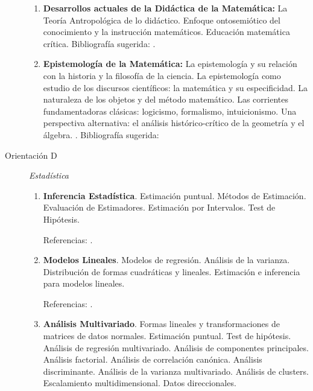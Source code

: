 \documentclass[a4paper, 12pt]{article}
\begin{document}
\begin{description}
\begin{enumerate}
\item\textbf{Desarrollos actuales de la Didáctica de la Matemática:}  La Teoría Antropológica de lo didáctico. Enfoque ontosemiótico del conocimiento y la instrucción matemáticos. Educación matemática crítica. Bibliografía sugerida: \cite{chevallard, Chevallard1999,Chevallard2001,Godino2017,Godino2007,Skovsmose1999,Skovsmose2012}.



\item\textbf{Epistemología de la Matemática:}
La epistemología y su relación con la historia y la filosofía de la ciencia. La epistemología como estudio de los discursos científicos: la matemática y su especificidad.  La naturaleza de los objetos y del método matemático. Las corrientes fundamentadoras clásicas: logicismo, formalismo, intuicionismo. Una perspectiva alternativa: el análisis histórico-crítico de la geometría y el álgebra.  
. Bibliografía sugerida: \cite{
klimo2,Barker1965,Gascon2001,Piaget1986,Pooper1956}




\end{enumerate}





\item[Orientación D]\emph{Estadística}
\begin{enumerate}



\item \textbf{Inferencia Estadística}.
Estimación puntual. Métodos de Estimación.
Evaluación de Estimadores.  Estimación por
Intervalos. Test de Hipótesis.

 

Referencias: \cite{bergero, bickel, degroot, lehmann,sen, rohatgi, scher}.



\item \textbf{Modelos Lineales}. Modelos de regresión. Análisis de la varianza. Distribución de formas cuadráticas y lineales. Estimación e inferencia para modelos lineales. 
 
 

 Referencias:  \cite{hock,  radrao, rawlyngs, scheffe, searle,  Venables, Montgonery}.
 
 
  

\item \textbf{Análisis Multivariado}. Formas lineales y transformaciones de matrices de datos normales. Estimación puntual. Test de hipótesis. Análisis de regresión multivariado. 
Análisis de componentes principales. Análisis factorial. Análisis de correlación canónica. Análisis discriminante. Análisis de la varianza multivariado. Análisis de clusters. Escalamiento multidimensional. Datos direccionales.


\end{enumerate}
\end{description}
\end{document}
